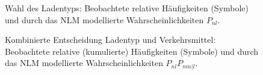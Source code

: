 \begin{figure}
\caption{\label{fig:nestedLogit-Toplevel}Wahl des Ladentyps: Beobachtete relative
  H\"aufigkeiten (Symbole) und durch das NLM modellierte
  Wahrscheinlichkeiten $P_{nl}$.
}
\end{figure}

\begin{figure}
\caption{\label{fig:nestedLogit-NL}Kombinierte Entscheidung Ladentyp
  und Verkehrsmittel: Beobachtete relative (kumulierte)
  H\"aufigkeiten (Symbole) und durch das NLM modellierte
  Wahrscheinlichkeiten $P_{nl} P_{nm|l}$.
}
\end{figure}

